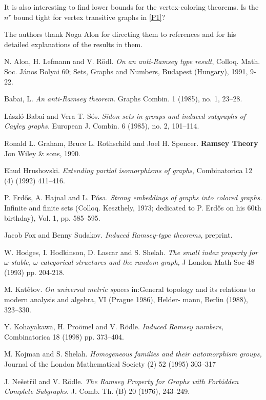 \documentclass[11pt]{amsart}
\begin{document}
It is also interesting to find lower bounds for the
vertex-coloring theorems. Is the $n^r$ bound tight for vertex
transitive graphs in \ref{P1}?


\bigskip
The authors  thank Noga Alon for directing  them to references
\cite{ALR,B,BS,FS} and  for his  detailed explanations of the
results in them.


\begin{thebibliography}{99}

 N. Alon, H. Lefmann and V. R\"odl.
{\sl On an anti-Ramsey type result}, Colloq. Math. Soc. J\'anos
Bolyai 60; Sets, Graphs and Numbers, Budapest (Hungary), 1991,
9-22.


 Babai, L.
{\sl An anti-Ramsey theorem.} Graphs Combin. 1 (1985), no. 1,
23--28.


 L\'aszl\'o Babai and  Vera T. S\'os.
{\sl Sidon sets in groups and induced subgraphs of Cayley graphs.}
European J. Combin. 6 (1985), no. 2, 101--114.



 Ronald L. Graham, Bruce L. Rothschild and Joel
  H. Spencer. {\bf Ramsey Theory} Jon Wiley \& sons, 1990.

 Ehud Hrushovski. {\sl Extending partial isomorphisms of
  graphs}, Combinatorica  12 (4) (1992) 411--416.

 P. Erd\H os, A. Hajnal and L.  P\'osa. {\sl Strong
    embeddings of graphs into colored graphs.} Infinite and finite
  sets (Colloq. Keszthely, 1973; dedicated to P. Erd\H os on his 60th
  birthday), Vol. 1, pp. 585--595.

 Jacob Fox and Benny Sudakov. {\sl Induced Ramsey-type
    theorems}, preprint.


 W. Hodges, I. Hodkinson, D. Lascar and S. Shelah. {\sl
The
    small index property for $\omega $-stable, $\omega$-categorical
    structures and the random graph,} J London Math Soc 48 (1993)
    pp. 204-218.

 M. Kat\v etov. {\sl On universal metric spaces} in:General
topology and its
relations to modern analysis and algebra, VI (Prague 1986), Helder-
mann, Berlin (1988), 323--330.


 Y. Kohayakawa, H. Pro\"omel and V. R\"odle. {\sl Induced
    Ramsey numbers,} Combinatorica 18 (1998) pp. 373--404.

  M. Kojman and S. Shelah. {\sl Homogeneous families and
their
automorphism groups,} Journal of the London Mathematical Society (2)
52
(1995) 303--317



 J. Ne\v set\v ril and V. R\"odle. {\sl The Ramsey
    Property for Graphs with Forbidden Complete Subgraphs.}
  J. Comb. Th. (B) 20 (1976), 243--249.



\end{thebibliography}
\end{document}
